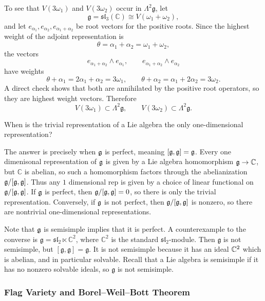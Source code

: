\documentclass[12pt]{article}
\begin{document}
\begin{solution}
    To see that $V(3\omega_1)$ and $V(3\omega_2)$ occur in $\Lambda^2\mathfrak g$, let
    \[
        \mathfrak g=\mathfrak{sl}_3(\mathbb C)\cong V(\omega_1+\omega_2),
    \]
    and let $e_{\alpha_1},e_{\alpha_2},e_{\alpha_1+\alpha_2}$ be root vectors for the positive roots. Since the highest weight of the adjoint representation is
    \[
        \theta=\alpha_1+\alpha_2=\omega_1+\omega_2,
    \]
    the vectors
    \[
        e_{\alpha_1+\alpha_2}\wedge e_{\alpha_1},
        \qquad
        e_{\alpha_1+\alpha_2}\wedge e_{\alpha_2}
    \]
    have weights
    \[
        \theta+\alpha_1=2\alpha_1+\alpha_2=3\omega_1,
        \qquad
        \theta+\alpha_2=\alpha_1+2\alpha_2=3\omega_2.
    \]
    A direct check shows that both are annihilated by the positive root operators, so they are highest weight vectors. Therefore
    \[
        V(3\omega_1)\subset \Lambda^2\mathfrak g,
        \qquad
        V(3\omega_2)\subset \Lambda^2\mathfrak g.
    \]
\end{solution}

\begin{exercise}
    When is the trivial representation of a Lie algebra the only one-dimensional representation?
\end{exercise}

\begin{solution}
    The answer is precisely when $\mathfrak{g}$ is perfect, meaning $[\mathfrak{g},\mathfrak{g}] = \mathfrak{g}$. Every one dimenisonal representation of $\mathfrak{g}$ is given by a Lie algebra homomorphism $\mathfrak{g} \to \mathbb C$, but $\mathbb C$ is abelian, so such a homomorphism factors through the abelianization $\mathfrak{g}/[\mathfrak{g},\mathfrak{g}]$. Thus any $1$ dimensional rep is given by a choice of linear functional on $\mathfrak{g}/[\mathfrak{g},\mathfrak{g}]$. If $\mathfrak{g}$ is perfect, then $\mathfrak{g}/[\mathfrak{g},\mathfrak{g}] = 0$, so there is only the trivial representation. Conversely, if $\mathfrak{g}$ is not perfect, then $\mathfrak{g}/[\mathfrak{g},\mathfrak{g}]$ is nonzero, so there are nontrivial one-dimensional representations.
\end{solution}
Note that $\mathfrak{g}$ is semisimple implies that it is perfect. A counterexample to the converse is $\mathfrak g=\mathfrak{sl}_2\ltimes \mathbb C^2$,
where $\mathbb C^2$ is the standard $\mathfrak{sl}_2$-module. Then $\mathfrak g$ is not semisimple, but
$[\mathfrak g,\mathfrak g]=\mathfrak g$. It is not semisimple because it has an ideal $\mathbb{C}^2$ which is abelian, and in particular solvable. Recall that a Lie algebra is semisimple if it has no nonzero solvable ideals, so $\mathfrak g$ is not semisimple.


\subsubsection{Flag Variety and Borel--Weil--Bott Theorem}
\end{document}
